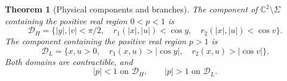 \documentclass[11pt]{article}
\numberwithin{equation}{section}
\newtheorem{theorem}{Theorem}[section]
\theoremstyle{definition}
\begin{document}
\begin{theorem}[Physical components and branches]\label{geo:components}
The component of $\mathbb C^2\setminus\Sigma$ containing the positive
real region $0<p<1$ is
\begin{equation}\label{geo:DH}
 \mathcal D_H=\{ |y|,|v|<\pi/2,\quad
 r_1(|x|,|u|)<\cos y,\quad r_2(|x|,|u|)<\cos v\}.
\end{equation}
The component containing the positive real region $p>1$ is
\begin{equation}\label{geo:DL}
 \mathcal D_L=\{x,u>0,\quad r_1(x,u)>|\cos y|,\quad
                              r_2(x,u)>|\cos v|\}.
\end{equation}
Both domains are contractible, and
\begin{equation}\label{geo:p-domains}
 |p|<1\text{ on }\mathcal D_H,\qquad |p|>1\text{ on }\mathcal D_L.
\end{equation}
\end{theorem}
\end{document}
